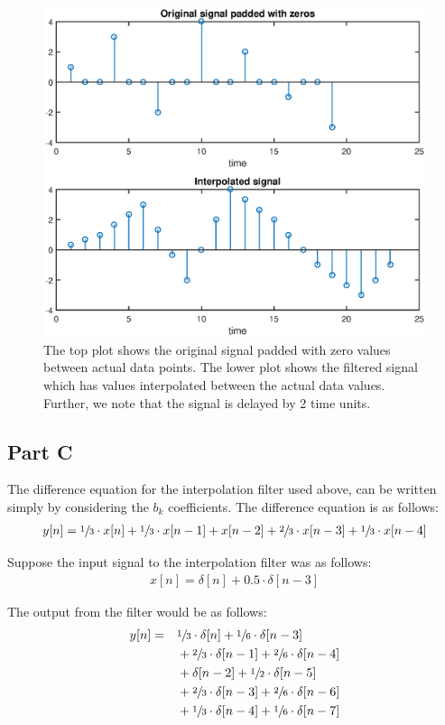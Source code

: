 \documentclass{article}
\begin{document}
\begin{figure}[H]
	\centering
	\includegraphics[scale=0.5]{fig1.eps}
	\caption{The top plot shows the original signal padded with zero values between actual data points. The lower plot shows the filtered signal which has values interpolated between the actual data values. Further, we note that the signal is delayed by 2 time units.}
\end{figure}

\subsection{Part C}

The difference equation for the interpolation filter used above, can be written simply by considering the $b_k$ coefficients. The difference equation is as follows:
\begin{align*}
	y[n] = \sfrac{1}{3} \cdot x[n] + \sfrac{1}{3} \cdot x[n-1] + x[n-2] + \sfrac{2}{3} \cdot x[n-3] + \sfrac{1}{3} \cdot x[n-4]
\end{align*}

Suppose the input signal to the interpolation filter was as follows:
\begin{align*}
	x[n] = \delta [n] + 0.5 \cdot \delta [n - 3]
\end{align*}

The output from the filter would be as follows:
\begin{align*}
	y[n] =& \quad \sfrac{1}{3} \cdot \delta [n] + \sfrac{1}{6} \cdot \delta [n-3] \\
	& \quad + \sfrac{2}{3} \cdot \delta [n-1] + \sfrac{2}{6} \cdot \delta [n-4] \\
	& \quad + \delta [n-2] + \sfrac{1}{2} \cdot \delta [n-5] \\
	& \quad + \sfrac{2}{3} \cdot \delta [n-3] + \sfrac{2}{6} \cdot \delta [n-6] \\
	& \quad + \sfrac{1}{3} \cdot \delta [n-4] + \sfrac{1}{6} \cdot \delta [n-7]
\end{align*}
\end{document}
